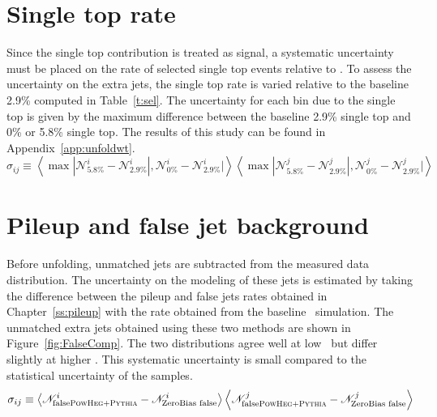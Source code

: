 
\section{Single top rate}
\label{ss:wt}
Since the single top contribution is treated as signal, a systematic uncertainty must be placed on the rate of selected single top events relative to \ttbar.  To assess the uncertainty on the extra jets, the single top rate is varied relative to the baseline 2.9\% computed in Table~\ref{t:sel}. The uncertainty for each bin due to the single top is given by the maximum difference between the baseline 2.9\% single top and 0\% or 5.8\%  single top. The results of this study can be found in Appendix~\ref{app:unfoldwt}.
\begin{displaymath}
\sigma_{ij}\equiv \left \langle \max {|{\mathscr N}_{5.8\%}^i-{\mathscr N}_{2.9\%}^i|, {\mathscr N}_{0\%}^i-{\mathscr N}_{2.9\%}^i|} \right \rangle \left \langle \max {|{\mathscr N}_{5.8\%}^j-{\mathscr N}_{2.9\%}^j|, {\mathscr N}_{0\%}^j-{\mathscr N}_{2.9\%}^j|} \right \rangle
\end{displaymath}

\section{Pileup and false jet background}
\label{ss:sysbkg}
Before unfolding, unmatched jets are subtracted from the measured data distribution. The uncertainty on the modeling of these jets is estimated 
by taking the difference between the pileup and false jets rates obtained in Chapter~\ref{ss:pileup} with the
rate obtained from the baseline \powpy\ simulation.
The unmatched extra jets obtained using these two methods are shown in Figure~\ref{fig:FalseComp}. 
The two distributions agree well at low \pt\ but differ slightly at higher \pt. This systematic uncertainty is small compared to the statistical uncertainty of the samples.
\begin{displaymath}
\sigma_{ij} \equiv \left \langle {\mathscr N}^{i}_{\textrm{false} \textsc{PowHeg+Pythia} }-{\mathscr N}^{i}_{\textrm{ZeroBias~false}} \right \rangle \left \langle {\mathscr N}^{j}_{\textrm{false} \textsc{PowHeg+Pythia} }-{\mathscr N}^{j}_{\textrm{ZeroBias~false}} \right \rangle
\end{displaymath}
